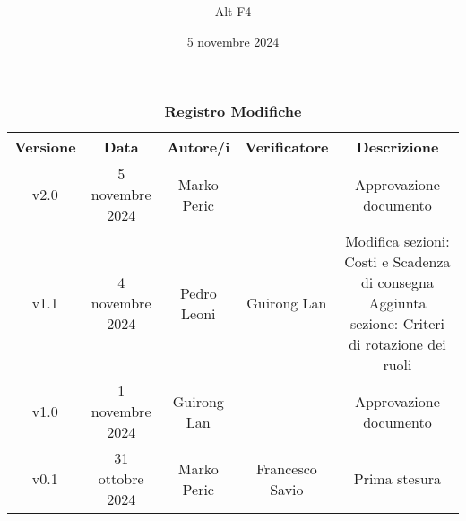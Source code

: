 \documentclass[a4paper, 12pt]{article}
\title{\Huge \textbf{\titolo}}
\author{\Large{Alt} \raisebox{0.3ex}{\normalsize  +} \Large{F4}}
\date{5 novembre 2024}
\def\logo{../Immagini/logo.jpeg}
\def\ultima-versione{v2.0}
\begin{document}
\begin{titlepage}      
    \maketitle
    \thispagestyle{empty}  

\end{titlepage}

\thispagestyle{plain}
\begin{table}[H]
    \centering
    \caption*{\textbf{\Large Registro Modifiche}}
    {\renewcommand{\arraystretch}{2}
    \begin{tabularx}{\textwidth}{| c | c | C | C | C |}
        \hline
            \textbf{\normalsize Versione} & 
            \textbf{\normalsize Data} & 
            \textbf{\normalsize Autore/i} & 
            \textbf{\normalsize Verificatore} &
            \textbf{\normalsize Descrizione} \\ 
        \hline \hline
        \ultima-versione & 
        5 novembre 2024& 
        Marko Peric &
        & 
        Approvazione documento \\
        \hline
        v1.1 &
        4 novembre 2024 &
        Pedro Leoni &
        Guirong Lan&
        Modifica sezioni: Costi e Scadenza di consegna
        Aggiunta sezione: Criteri di rotazione dei ruoli \\
        \hline
        v1.0 & 
        1 novembre 2024& 
        Guirong Lan &
        & 
        Approvazione documento \\
        \hline 
        v0.1 &
        31 ottobre 2024 & 
        Marko Peric &
        Francesco Savio &
        Prima stesura \\
        \hline
    \end{tabularx}}
\end{table}
\restoregeometry
\end{document}
